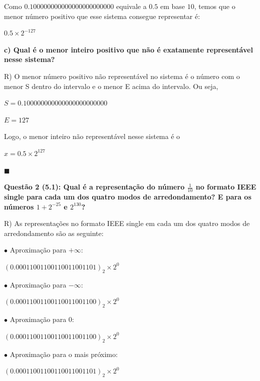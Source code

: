 \documentclass{article}
\begin{document}
\qquad Como $0.100000000000000000000000$ equivale a $0.5$ em base $10$, temos que o menor número positivo que esse sistema consegue representar é:

\begin{center}
$0.5 \times 2^{-127}$
\end{center} 

\quad\textbf{c) Qual é o menor inteiro positivo que não é exatamente representável nesse sistema?}

\bigskip
\qquad R) O menor número positivo não representável no sistema é o número com o menor S dentro do intervalo e o menor E acima do intervalo. Ou seja,

\begin{center}
$S = 0.100000000000000000000000$

$E = 127$
\end{center}

\qquad Logo, o menor inteiro não representável nesse sistema é o

\begin{center}
$x = 0.5 \times 2^{127}$
\end{center}

\begin{flushright}
$\blacksquare$
\end{flushright}

\textbf{Questão 2 (5.1): Qual é a representação do número $\frac{1}{10}$ no formato IEEE single para cada um dos quatro modos de arredondamento? E para os números $1 + 2^{-25}$ e $2^{130}$?}

\bigskip
\quad R) As representações no formato IEEE single em cada um dos quatro modos de arredondamento são as seguinte:

\bigskip
{}

\qquad$\bullet$ Aproximação para $+\infty$:

\qquad\qquad$(0.00011001100110011001101)_{2} \times 2^{0}$

\bigskip
\qquad$\bullet$ Aproximação para $-\infty$:

\qquad\qquad$(0.00011001100110011001100)_{2} \times 2^{0}$

\bigskip
\qquad$\bullet$ Aproximação para $0$:

\qquad\qquad$(0.00011001100110011001100)_{2} \times 2^{0}$

\bigskip
\qquad$\bullet$ Aproximação para o mais próximo:

\qquad\qquad$(0.00011001100110011001101)_{2} \times 2^{0}$
\end{document}
